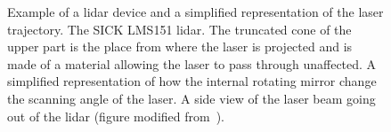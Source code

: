 \begin{figure}
    \centering
    \caption[Example of a \gls*{lidar} device and a simplified representation of the laser trajectory.]{Example of a \gls*{lidar} device and a simplified representation of the laser trajectory. \protect{} The SICK LMS151 \gls*{lidar}. The truncated cone of the upper part is the place from where the laser is projected and is made of a material allowing the laser to pass through unaffected. \protect{} A simplified representation of how the internal rotating mirror change the scanning angle of the laser. \protect{} A side view of the laser beam going out of the \gls*{lidar} (figure modified from~\citep{LMS151Manual}).}
    \label{fig:lidar_basics}
\end{figure}

